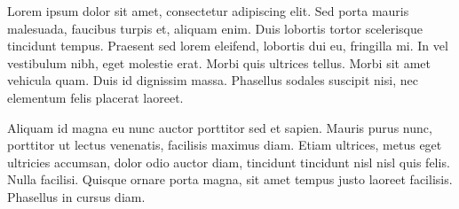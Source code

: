 

Lorem ipsum dolor sit amet, consectetur adipiscing elit. Sed porta mauris malesuada, faucibus turpis et, aliquam enim.
Duis lobortis tortor scelerisque tincidunt tempus. Praesent sed lorem eleifend, lobortis dui eu, fringilla mi.
In vel vestibulum nibh, eget molestie erat. Morbi quis ultrices tellus. Morbi sit amet vehicula quam.
Duis id dignissim massa. Phasellus sodales suscipit nisi, nec elementum felis placerat laoreet.

Aliquam id magna eu nunc auctor porttitor sed et sapien. Mauris purus nunc, porttitor ut lectus venenatis, facilisis maximus diam. 
Etiam ultrices, metus eget ultricies accumsan, dolor odio auctor diam, tincidunt tincidunt nisl nisl quis felis.
Nulla facilisi. Quisque ornare porta magna, sit amet tempus justo laoreet facilisis. Phasellus in cursus diam.
